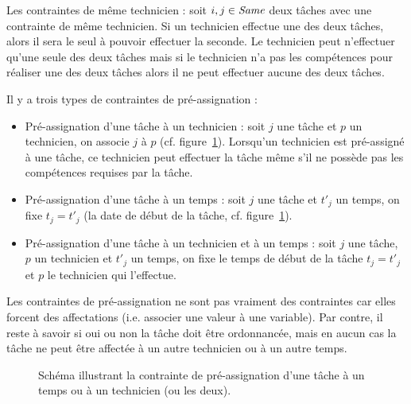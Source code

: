 Les contraintes de même technicien : soit $i,j \in \textit{Same}$ deux tâches avec une contrainte de même technicien. 
Si un technicien effectue une des deux tâches, alors il sera le seul à pouvoir effectuer la seconde. 
Le technicien peut n'effectuer qu'une seule des deux tâches mais si le technicien n'a pas les compétences pour réaliser une des deux tâches alors il ne peut effectuer aucune des deux tâches.

Il y a trois types de contraintes de pré-assignation : 
\begin{itemize}
\item Pré-assignation d'une tâche à un technicien : soit $j$ une tâche et $p$ un technicien, on associe $j$ à $p$ (cf. figure~\ref{fig:cons:app:time}). Lorsqu'un technicien est pré-assigné à une tâche, ce technicien peut effectuer la tâche même s'il ne possède pas les compétences requises par la tâche.
\item Pré-assignation d'une tâche à un temps : soit $j$ une tâche et $t'_j$ un temps, on fixe $t_{j}=t'_j$ (la date de début de la tâche, cf. figure~\ref{fig:cons:app:time}).
\item Pré-assignation d'une tâche à un technicien et à un temps : soit $j$ une tâche, $p$ un technicien et $t'_{j}$ un temps, on fixe le temps de début de la tâche $t_j=t'_j$ et $p$ le technicien qui l'effectue.
\end{itemize}

Les contraintes de pré-assignation ne sont pas vraiment des contraintes car elles forcent des affectations (i.e. associer une valeur à une variable). Par contre, il reste à savoir si oui ou non la tâche doit être ordonnancée, mais en aucun cas la tâche ne peut être affectée à un autre technicien ou à un autre temps.  




\begin{figure}[H]
\centering
{}
\caption{Schéma illustrant la contrainte de pré-assignation d'une tâche à un temps ou à un technicien (ou les deux).\label{fig:cons:app:time}}
\end{figure}


